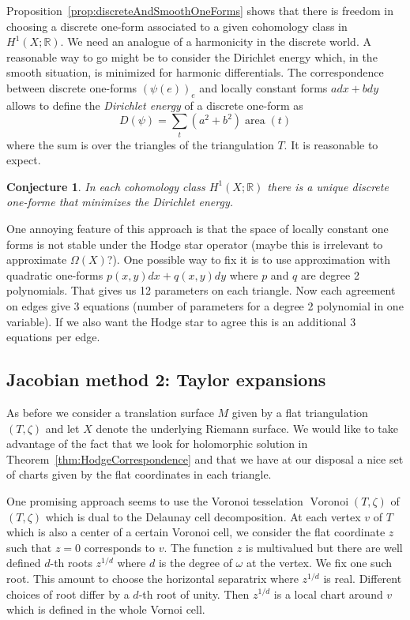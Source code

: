 \documentclass[a4paper,12pt]{article}
\def\bR{\mathbb{R}}
\def\area{\operatorname{area}}
\def\Voronoi{\operatorname{Voronoi}}
\newtheorem{conjecture}[definition]{Conjecture}
\begin{document}
Proposition~\ref{prop:discreteAndSmoothOneForms} shows that there is freedom
in choosing a discrete one-form associated to a given cohomology class in $H^1(X; \bR)$.
We need an analogue of a harmonicity in the discrete world.
A reasonable way to go might be to consider the Dirichlet
energy which, in the smooth situation, is minimized for harmonic differentials.
The correspondence between discrete one-forms $(\psi(e))_e$ and locally constant
forms $adx + bdy$ allows to define the \emph{Dirichlet energy} of a discrete one-form as
\[
D(\psi) = \sum_{t} (a^2 + b^2) \area(t)
\]
where the sum is over the triangles of the triangulation $T$.
It is reasonable to expect.
\begin{conjecture}
In each cohomology class $H^1(X; \bR)$ there is a unique discrete one-forme
that minimizes the Dirichlet energy.
\end{conjecture}

One annoying feature of this approach is that the space of locally constant
one forms is not stable under the Hodge star operator (maybe this is
irrelevant to approximate $\Omega(X)$?). One possible way to fix it is to use
approximation with quadratic one-forms $p(x,y) dx + q(x,y) dy$ where $p$ and $q$
are degree 2 polynomials. That gives us 12 parameters on each triangle. Now each
agreement on edges give 3 equations (number of parameters for a degree 2 polynomial
in one variable). If we also want the Hodge star to agree this is an additional
3 equations per edge.

\subsection{Jacobian method 2: Taylor expansions}
As before we consider a translation surface $M$ given by a flat triangulation $(T, \zeta)$
and let $X$ denote the underlying Riemann surface. We would like to take advantage of
the fact that we look for holomorphic solution in Theorem~\ref{thm:HodgeCorrespondence}
and that we have at our disposal a nice set of charts given by the flat coordinates in each triangle.

One promising approach seems to use the Voronoi tesselation $\Voronoi(T,
\zeta)$ of $(T, \zeta)$ which is dual to the Delaunay cell decomposition. At
each vertex $v$ of $T$ which is also a center of a certain Voronoi cell, we
consider the flat coordinate $z$ such that $z=0$ corresponds to $v$. The
function $z$ is multivalued but there are well defined $d$-th roots $z^{1/d}$ where $d$ is the
degree of $\omega$ at the vertex. We fix one such root. This amount to choose the
horizontal separatrix where $z^{1/d}$ is real. Different choices of root differ
by a $d$-th root of unity. Then $z^{1/d}$ is a local chart around $v$ which is
defined in the whole Vornoi cell.
\end{document}
